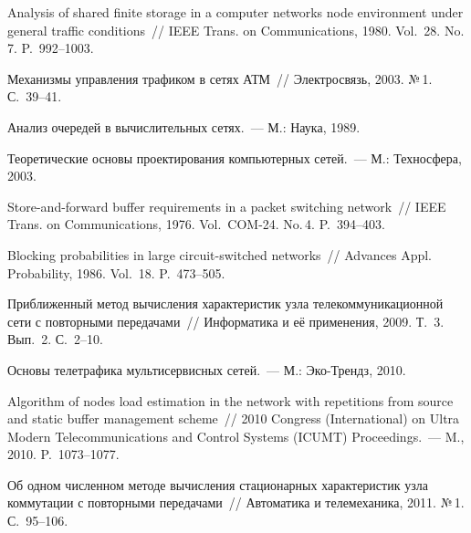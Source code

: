 \begin{multicols}{2}
{{\begin{thebibliography}{99}
Analysis of shared finite storage in a computer networks node environment under 
general traffic conditions~// IEEE Trans. on Communications, 1980. Vol.~28. 
No.\,7. P.~992--1003.

Механизмы управления трафиком в сетях АТМ~// Электросвязь, 2003. №\,1. 
С.~39--41.

Анализ очередей в вычислительных сетях.~--- М.: Наука, 1989.

Теоретические основы проектирования компьютерных сетей.~--- М.: 
Техносфера, 2003.

Store-and-forward buffer requirements in a packet switching network~// IEEE 
Trans. on Communications, 1976. Vol.~COM-24. No.\,4. P.~394--403.

Blocking probabilities in large circuit-switched networks~// Advances Appl. 
Probability, 1986. Vol.~18. P.~473--505.

Приближенный метод вычисления характеристик узла 
телекоммуникационной сети с повторными передачами~// Информатика и её 
применения, 2009. Т.~3. Вып.~2. С.~2--10.

Основы телетрафика мультисервисных сетей.~--- М.: Эко-Трендз, 2010. 


Algorithm of nodes load estimation in the network with repetitions from source 
and static buffer management scheme~// 2010 Congress (International) on Ultra 
Modern Telecommunications and Control Systems (ICUMT) Proceedings.~--- 
M., 2010. P.~1073--1077.

\label{end\stat}

Об одном численном методе вычисления стационарных характеристик узла 
коммутации с повторными передачами~// Автоматика и телемеханика, 2011. 
№\,1. С.~95--106.
 \end{thebibliography}
}
}


\end{multicols}
       